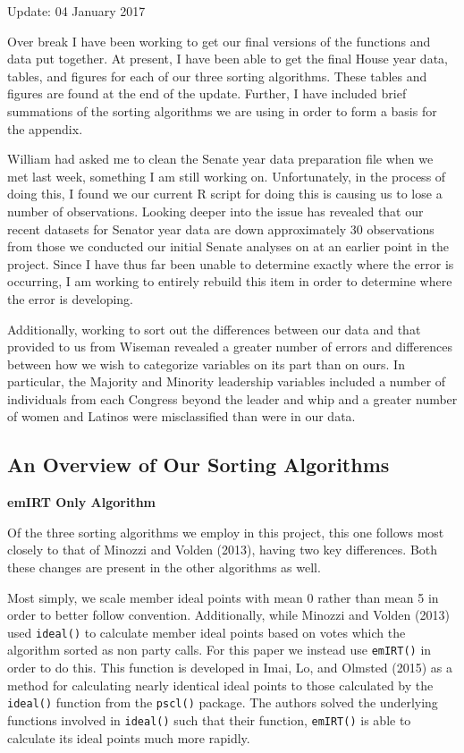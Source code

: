 \documentclass[12pt]{article}
\begin{document}
	
	\begin{center}
		Update: 04 January 2017
	\end{center}

Over break I have been working to get our final versions of the functions and data put together. At present, I have been able to get the final House year data, tables, and figures for each of our three sorting algorithms. These tables and figures are found at the end of the update. Further, I have included brief summations of the sorting algorithms we are using in order to form a basis for the appendix.

William had asked me to clean the Senate year data preparation file when we met last week, something I am still working on. Unfortunately, in the process of doing this, I found we our current R script for doing this is causing us to lose a number of observations. Looking deeper into the issue has revealed that our recent datasets for Senator year data are down approximately 30 observations from those we conducted our initial Senate analyses on at an earlier point in the project. Since I have thus far been unable to determine exactly where the error is occurring, I am working to entirely rebuild this item in order to determine where the error is developing.

Additionally, working to sort out the differences between our data and that provided to us from Wiseman revealed a greater number of errors and differences between how we wish to categorize variables on its part than on ours. In particular, the Majority and Minority leadership variables included a number of individuals from each Congress beyond the leader and whip and a greater number of women and Latinos were misclassified than were in our data.

\subsection*{An Overview of Our Sorting Algorithms}

\noindent
\textbf{emIRT Only Algorithm}

Of the three sorting algorithms we employ in this project, this one follows most closely to that of Minozzi and Volden (2013), having two key differences. Both these changes are present in the other algorithms as well.

Most simply, we scale member ideal points with mean 0 rather than mean 5 in order to better follow convention. Additionally, while Minozzi and Volden (2013) used \verb|ideal()| to calculate member ideal points based on votes which the algorithm sorted as non party calls. For this paper we instead use \verb|emIRT()| in order to do this. This function is developed in Imai, Lo, and Olmsted (2015) as a method for calculating nearly identical ideal points to those calculated by the \verb|ideal()| function from the \verb|pscl()| package. The authors solved the underlying functions involved in \verb|ideal()| such that their function, \verb|emIRT()| is able to calculate its ideal points much more rapidly. 
\end{document}
